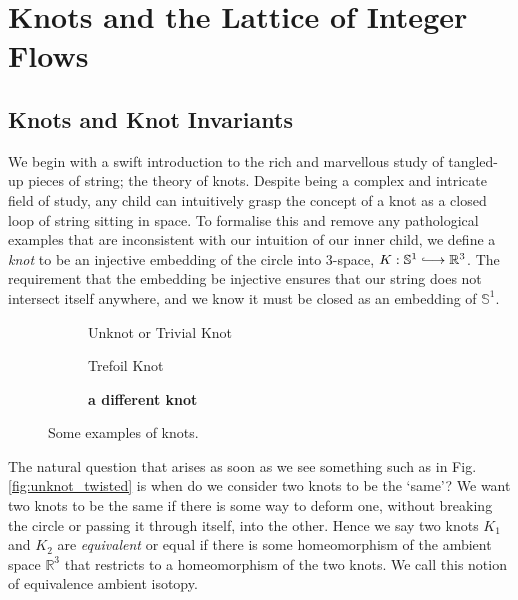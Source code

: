 \documentclass[12pt]{report}
\newcommand{\R}{\mathbb{R}}
\renewcommand{\S}{\mathbb{S}}
\newcommand{\notered}[1]{{\color{Red} \textbf{#1}}}
\begin{document}
\chapter{Knots and the Lattice of Integer Flows}

\section{Knots and Knot Invariants}

We begin with a swift introduction to the rich and marvellous study of tangled-up pieces of string; the theory of knots. Despite being a complex and intricate field of study, any child can intuitively grasp the concept of a knot as a closed loop of string sitting in space. To formalise this and remove any pathological examples that are inconsistent with our intuition of our inner child, we define a \textit{knot} to be an injective embedding of the circle into $3$-space, $K: \S^{1} \lhook\joinrel\longrightarrow \R^{3}$. The requirement that the embedding be injective ensures that our string does not intersect itself anywhere, and we know it must be closed as an embedding of $\S^{1}$.

\begin{figure}[hbt]
	\centering
	\hfill
	\begin{subfigure}[b]{0.3 \textwidth}
		\centering
		\def\svgscale{0.2}
		
		\caption{Unknot or Trivial Knot}
	\end{subfigure}
	\hfill
	\begin{subfigure}[b]{0.3 \textwidth}
		\centering
		\def\svgscale{0.2}
		
		\caption{Trefoil Knot}
	\end{subfigure}
	\hfill
	\begin{subfigure}[b]{0.3 \textwidth}
		\centering
		\def\svgscale{0.2}
		
		\caption{\notered{a different knot}}
	\end{subfigure}
	\caption{Some examples of knots.}
	\label{knot-examples}
	\hfill \phantom{1}
\end{figure}

The natural question that arises as soon as we see something such as in Fig. \ref{fig:unknot_twisted} is when do we consider two knots to be the `same'? We want two knots to be the same if there is some way to deform one, without breaking the circle or passing it through itself, into the other. Hence we say two knots $K_{1}$ and $K_{2}$ are \textit{equivalent} or equal if there is some homeomorphism of the ambient space $\R^{3}$ that restricts to a homeomorphism of the two knots. We call this notion of equivalence ambient isotopy.
\end{document}
